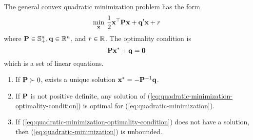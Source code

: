\begin{example}
	The general convex quadratic minimization problem has the form
	\begin{equation}
		\min_{\mathbf{x}}\,\frac{1}{2}\mathbf{x}^{\top}\mathbf{P}\mathbf{x}+\mathbf{q}^{\prime}\mathbf{x}+r \label{eq:quadratic-minimization}
	\end{equation}
	where \(\mathbf{P}\in\mathbb{S}_{+}^{n},\mathbf{q}\in\mathbb{R}^{n}\), and \(r\in\mathbb{R}\). The optimality condition is
	\begin{equation}
		\mathbf{P}\mathbf{x}^{*}+\mathbf{q}=\mathbf{0}
		\label{eq:quadratic-minimization-optimality-condition}
	\end{equation}
	which is a set of linear equations.
	\begin{enumerate}
		\item If \(\mathbf{P}\succ 0\), exists a unique solution \(\mathbf{x}^{*}=-\mathbf{P}^{-1}\mathbf{q}\).
		\item If \(\mathbf{P}\) is not positive definite, any solution of (\ref{eq:quadratic-minimization-optimality-condition}) is optimal for (\ref{eq:quadratic-minimization}).
		\item If (\ref{eq:quadratic-minimization-optimality-condition}) does not have a solution, then (\ref{eq:quadratic-minimization}) is unbounded.
	\end{enumerate}
\end{example}

